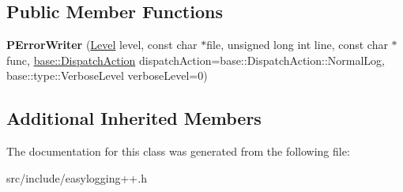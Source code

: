 \subsection*{Public Member Functions}
\begin{DoxyCompactItemize}
\item 
\mbox{\label{classel_1_1base_1_1_p_error_writer_a60d1ff92d16e3927e2c4b5bb77d34092}} 
{\bfseries P\+Error\+Writer} (\hyperlink{namespaceel_ab0ac6091262344c52dd2d3ad099e8e36}{Level} level, const char $\ast$file, unsigned long int line, const char $\ast$func, \hyperlink{namespaceel_1_1base_a3aa2563d38e47388ba242a1694fc2839}{base\+::\+Dispatch\+Action} dispatch\+Action=base\+::\+Dispatch\+Action\+::\+Normal\+Log, base\+::type\+::\+Verbose\+Level verbose\+Level=0)
\end{DoxyCompactItemize}
\subsection*{Additional Inherited Members}


The documentation for this class was generated from the following file\+:\begin{DoxyCompactItemize}
\item 
src/include/easylogging++.\+h\end{DoxyCompactItemize}
